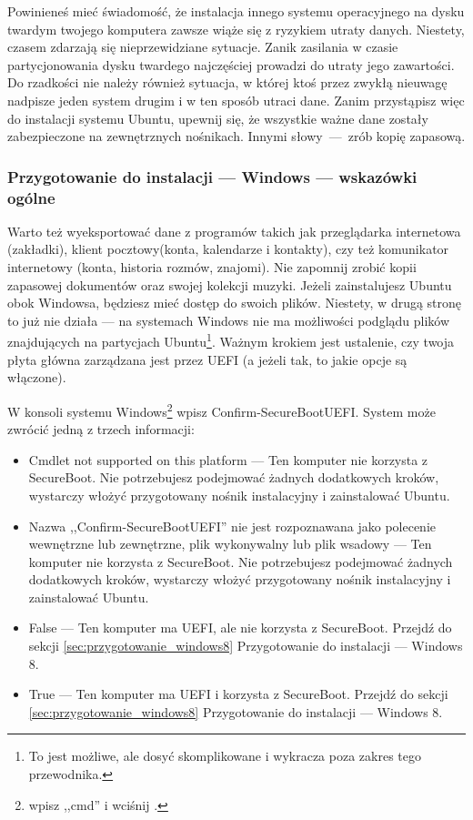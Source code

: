 \label{sec:przygotowanie_windows}Powinieneś mieć świadomość, że instalacja innego systemu operacyjnego na dysku twardym twojego komputera zawsze wiąże się z ryzykiem utraty danych. Niestety, czasem zdarzają się nieprzewidziane sytuacje. Zanik zasilania w czasie partycjonowania dysku twardego najczęściej prowadzi do utraty jego zawartości. Do rzadkości nie należy również sytuacja, w której ktoś przez zwykłą nieuwagę  nadpisze jeden system drugim i w ten sposób utraci dane. Zanim przystąpisz więc do instalacji systemu Ubuntu, upewnij się, że wszystkie ważne dane zostały zabezpieczone na zewnętrznych nośnikach. Innymi słowy~---~zrób kopię zapasową.

\subsubsection{Przygotowanie do instalacji --- Windows --- wskazówki ogólne}
Warto też wyeksportować dane z programów takich jak przeglądarka internetowa (zakładki), klient pocztowy(konta, kalendarze i kontakty), czy też komunikator internetowy (konta, historia rozmów, znajomi). Nie zapomnij zrobić kopii zapasowej dokumentów oraz swojej kolekcji muzyki. Jeżeli zainstalujesz Ubuntu obok Windowsa, będziesz mieć dostęp do swoich plików. Niestety, w drugą stronę to już nie działa --- na systemach Windows nie ma możliwości podglądu plików znajdujących na partycjach Ubuntu\footnote{To jest możliwe, ale dosyć skomplikowane i wykracza poza zakres tego przewodnika.}.
Ważnym krokiem jest ustalenie, czy twoja płyta główna zarządzana jest przez UEFI (a jeżeli tak, to jakie opcje są włączone).

W konsoli systemu Windows\footnote{ wpisz ,,cmd'' i wciśnij \keys{\returnwin}.} wpisz \textcolor{ubuntu_orange}{Confirm-SecureBootUEFI}. System może zwrócić jedną z trzech informacji:
\begin{itemize}
\item \textcolor{ubuntu_orange}{Cmdlet not supported on this platform} --- Ten komputer nie korzysta z SecureBoot. Nie potrzebujesz podejmować żadnych dodatkowych kroków, wystarczy włożyć przygotowany nośnik instalacyjny i zainstalować Ubuntu.
\item \textcolor{ubuntu_orange}{Nazwa ,,Confirm-SecureBootUEFI'' nie jest rozpoznawana jako polecenie wewnętrzne lub \linebreak zewnętrzne, plik wykonywalny lub plik wsadowy} --- Ten komputer nie korzysta z SecureBoot. Nie potrzebujesz podejmować żadnych dodatkowych kroków, wystarczy włożyć przygotowany nośnik instalacyjny i zainstalować Ubuntu.
\item \textcolor{ubuntu_orange}{False} --- Ten komputer ma UEFI, ale nie korzysta z SecureBoot. Przejdź do sekcji \ref{sec:przygotowanie_windows8} Przygotowanie do instalacji --- Windows 8.
\item \textcolor{ubuntu_orange}{True} --- Ten komputer ma UEFI i korzysta z SecureBoot. Przejdź do sekcji \ref{sec:przygotowanie_windows8} Przygotowanie do instalacji --- Windows 8.
\end{itemize}
